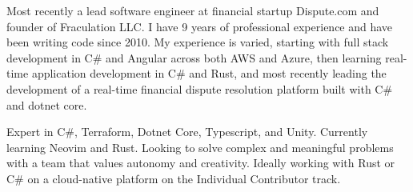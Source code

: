 

\begin{cvparagraph}

Most recently a lead software engineer at financial startup Dispute.com and founder of Fraculation LLC.\@
I have 9 years of professional experience and have been writing code since 2010. My experience is varied, starting with 
full stack development in C\# and Angular across both AWS and Azure, then learning real-time application development in C\# and Rust,
and most recently leading the development of a real-time financial dispute resolution platform built with C\# and dotnet core.

Expert in C\#, Terraform, Dotnet Core, Typescript, and Unity. Currently learning Neovim and Rust. 
Looking to solve complex and meaningful problems with a team that values autonomy and creativity.
Ideally working with Rust or C\# on a cloud-native platform on the Individual Contributor track.


\end{cvparagraph}
